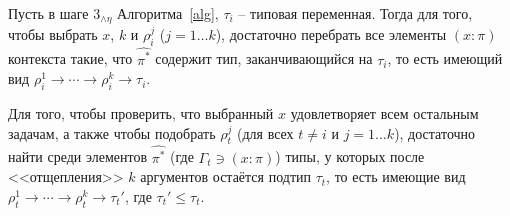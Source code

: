 \documentclass[../main.tex]{subfiles}
\begin{document}
\begin{corollary} \label{прояснение}
    Пусть в шаге $3_{\wedge \eta}$ Алгоритма~\ref{alg}, $\tau_i$ -- типовая переменная. Тогда для того, чтобы выбрать $x$, $k$ и $\rho_i^j$ ($j = 1 \dots k$), достаточно перебрать все элементы $(x \colon \pi)$ контекста такие, что $\hat{\pi^*}$ содержит тип, заканчивающийся на $\tau_i$, то есть имеющий вид $\rho_i^1 \to \cdots \to \rho_i^k \to \tau_i$. 
    
    Для того, чтобы проверить, что выбранный $x$ удовлетворяет всем остальным задачам, а также чтобы подобрать $\rho_t^j$ (для всех $t \neq i$ и $j = 1 \dots k$), достаточно найти среди элементов $\hat{\pi^*}$ (где $\Gamma_t \ni (x \colon \pi)$) типы, у которых после <<отщепления>> $k$ аргументов остаётся подтип $\tau_t$, то есть имеющие вид $\rho_t^1 \to \cdots \to \rho_t^k \to \tau_t'$, где $\tau_t' \leqslant \tau_t$.
    
\end{corollary}
\end{document}
